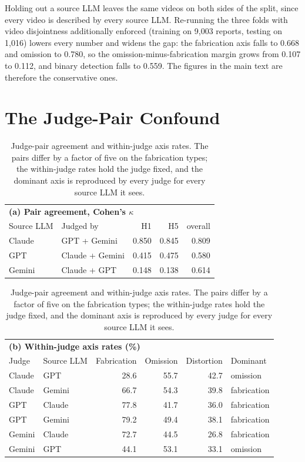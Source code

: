 Holding out a source LLM leaves the same videos on both sides of the split,
since every video is described by every source LLM. Re-running the three folds
with video disjointness additionally enforced (training on 9{,}003 reports,
testing on 1{,}016) lowers every number and widens the gap: the fabrication
axis falls to 0.668 and omission to 0.780, so the omission-minus-fabrication
margin grows from 0.107 to 0.112, and binary detection falls to 0.559. The
figures in the main text are therefore the conservative ones.

\section{The Judge-Pair Confound}
\label{app:confound}

\begin{table}[H]
\caption{Judge-pair agreement and within-judge axis rates. The pairs differ by
a factor of five on the fabrication types; the within-judge rates hold the
judge fixed, and the dominant axis is reproduced by every judge for every
source LLM it sees.}
\label{tab:confound}
\centering\footnotesize
\begin{tabular}{llrrr}
\toprule
\multicolumn{5}{l}{\textbf{(a) Pair agreement, Cohen's $\kappa$}} \\
Source LLM & Judged by & H1 & H5 & overall \\
\midrule
Claude & GPT + Gemini    & 0.850 & 0.845 & 0.809 \\
GPT    & Claude + Gemini & 0.415 & 0.475 & 0.580 \\
Gemini & Claude + GPT    & 0.148 & 0.138 & 0.614 \\
\bottomrule
\end{tabular}

\vspace{1em}

\begin{tabular}{llrrrl}
\toprule
\multicolumn{6}{l}{\textbf{(b) Within-judge axis rates (\%)}} \\
Judge & Source LLM & Fabrication & Omission & Distortion & Dominant \\
\midrule
Claude & GPT    & 28.6 & 55.7 & 42.7 & omission \\
Claude & Gemini & 66.7 & 54.3 & 39.8 & fabrication \\
GPT    & Claude & 77.8 & 41.7 & 36.0 & fabrication \\
GPT    & Gemini & 79.2 & 49.4 & 38.1 & fabrication \\
Gemini & Claude & 72.7 & 44.5 & 26.8 & fabrication \\
Gemini & GPT    & 44.1 & 53.1 & 33.1 & omission \\
\bottomrule
\end{tabular}
\end{table}

